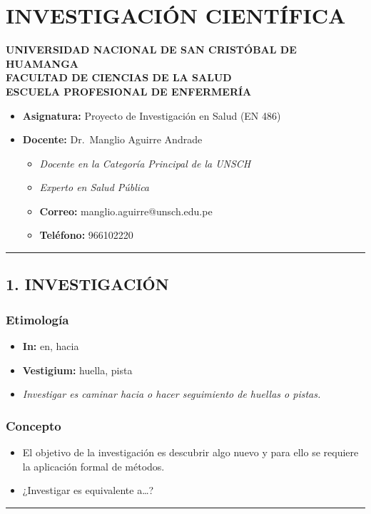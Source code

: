 ﻿\documentclass[12pt,a4paper]{article}
\begin{document}
\section{INVESTIGACIÓN CIENTÍFICA}\label{investigaciuxf3n-cientuxedfica}  \textbf{UNIVERSIDAD NACIONAL DE SAN CRISTÓBAL DE HUAMANGA}\\ \textbf{FACULTAD DE CIENCIAS DE LA SALUD}\\ \textbf{ESCUELA PROFESIONAL DE ENFERMERÍA}  \begin{itemize} \tightlist \item   \textbf{Asignatura:} Proyecto de Investigación en Salud (EN 486)\\ \item   \textbf{Docente:} Dr.~Manglio Aguirre Andrade    \begin{itemize}   \tightlist   \item     \emph{Docente en la Categoría Principal de la UNSCH}\\   \item     \emph{Experto en Salud Pública}\\   \item     \textbf{Correo:} manglio.aguirre@unsch.edu.pe\\   \item     \textbf{Teléfono:} 966102220   \end{itemize} \end{itemize}  \begin{center}\rule{0.5\linewidth}{0.5pt}\end{center}  \subsection{1. INVESTIGACIÓN}\label{investigaciuxf3n}  \subsubsection{Etimología}\label{etimologuxeda}  \begin{itemize} \tightlist \item   \textbf{In:} en, hacia \item   \textbf{Vestigium:} huella, pista \item   \emph{Investigar es caminar hacia o hacer seguimiento de huellas o   pistas.} \end{itemize}  \subsubsection{Concepto}\label{concepto}  \begin{itemize} \tightlist \item   El objetivo de la investigación es descubrir algo nuevo y para ello se   requiere la aplicación formal de métodos. \item   ¿Investigar es equivalente a\ldots? \end{itemize}  \begin{center}\rule{0.5\linewidth}{0.5pt}\end{center}  
\end{document}
